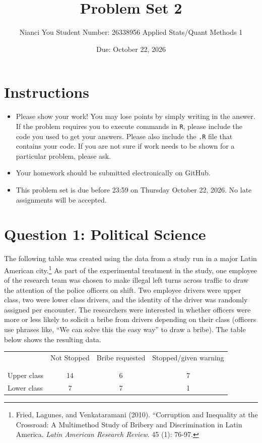 \documentclass[12pt,letterpaper]{article}
\title{Problem Set 2}
\date{Due: October 22, 2026}
\author{Nianci You Student Number: 26338956 Applied Stats/Quant Methods 1}
\begin{document}
	\maketitle
	\section*{Instructions}
\begin{itemize}
	\item Please show your work! You may lose points by simply writing in the answer. If the problem requires you to execute commands in \texttt{R}, please include the code you used to get your answers. Please also include the \texttt{.R} file that contains your code. If you are not sure if work needs to be shown for a particular problem, please ask.
	\item Your homework should be submitted electronically on GitHub.
	\item This problem set is due before 23:59 on Thursday October 22, 2026. No late assignments will be accepted.

\end{itemize}

	
	\vspace{.5cm}
	\section*{Question 1: Political Science}
		\vspace{.25cm}
	The following table was created using the data from a study run in a major Latin American city.\footnote{Fried, Lagunes, and Venkataramani (2010). ``Corruption and Inequality at the Crossroad: A Multimethod Study of Bribery and Discrimination in Latin America. \textit{Latin American Research Review}. 45 (1): 76-97.} As part of the experimental treatment in the study, one employee of the research team was chosen to make illegal left turns across traffic to draw the attention of the police officers on shift. Two employee drivers were upper class, two were lower class drivers, and the identity of the driver was randomly assigned per encounter. The researchers were interested in whether officers were more or less likely to solicit a bribe from drivers depending on their class (officers use phrases like, ``We can solve this the easy way'' to draw a bribe). The table below shows the resulting data.

\newpage
\begin{table}[h!]
	\centering
	\begin{tabular}{l | c c c }
		& Not Stopped & Bribe requested & Stopped/given warning \\
		\\[-1.8ex] 
		\hline \\[-1.8ex]
		Upper class & 14 & 6 & 7 \\
		Lower class & 7 & 7 & 1 \\
		\hline
	\end{tabular}
\end{table}
\end{document}
